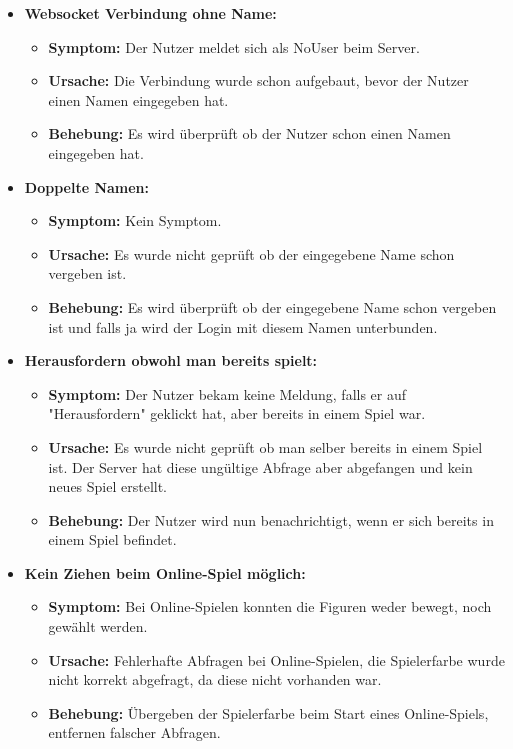 \documentclass[parskip=full]{scrartcl}
\begin{document}
\begin{itemize}
\item{\textbf{Websocket Verbindung ohne Name:}}
\begin{itemize}
	\item{\textbf{Symptom:}} Der Nutzer meldet sich als NoUser beim Server.
	\item{\textbf{Ursache:}} Die Verbindung wurde schon aufgebaut, bevor der Nutzer einen Namen eingegeben hat.
	\item{\textbf{Behebung:}} Es wird überprüft ob der Nutzer schon einen Namen eingegeben hat.
\end{itemize}

\item{\textbf{Doppelte Namen:}}
\begin{itemize}
	\item{\textbf{Symptom:}} Kein Symptom.
	\item{\textbf{Ursache:}} Es wurde nicht geprüft ob der eingegebene Name schon vergeben ist.
	\item{\textbf{Behebung:}} Es wird überprüft ob der eingegebene Name schon vergeben ist und falls ja wird der Login mit diesem Namen unterbunden.
\end{itemize}

\item{\textbf{Herausfordern obwohl man bereits spielt:}}
\begin{itemize}
	\item{\textbf{Symptom:}} Der Nutzer bekam keine Meldung, falls er auf "Herausfordern" geklickt hat, aber bereits in einem Spiel war.
	\item{\textbf{Ursache:}} Es wurde nicht geprüft ob man selber bereits in einem Spiel ist. Der Server hat diese ungültige Abfrage aber abgefangen und kein neues Spiel erstellt. 
	\item{\textbf{Behebung:}} Der Nutzer wird nun benachrichtigt, wenn er sich bereits in einem Spiel befindet.
\end{itemize}


\item{\textbf{Kein Ziehen beim Online-Spiel möglich:}}
\begin{itemize}
	\item{\textbf{Symptom:}} Bei Online-Spielen konnten die Figuren weder bewegt, noch gewählt werden.
	\item{\textbf{Ursache:}} Fehlerhafte Abfragen bei Online-Spielen, die Spielerfarbe wurde nicht korrekt abgefragt, da diese nicht vorhanden war.
	\item{\textbf{Behebung:}} Übergeben der Spielerfarbe beim Start eines Online-Spiels, entfernen falscher Abfragen.
\end{itemize}


\end{itemize}
\end{document}
